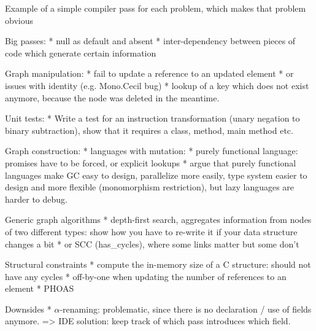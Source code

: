 Example of a simple compiler pass for each problem, which makes that problem obvious

Big passes:
* null as default and absent
* inter-dependency between pieces of code which generate certain information

Graph manipulation:
* fail to update a reference to an updated element
* or issues with identity (e.g. Mono.Cecil bug)
* lookup of a key which does not exist anymore, because the node was deleted in the meantime.

Unit tests:
* Write a test for an instruction transformation (unary negation to binary subtraction), show that it requires a class, method, main method etc.

Graph construction:
* languages with mutation: 
* purely functional language: promises have to be forced, or explicit lookups
* argue that purely functional languages make GC easy to design, parallelize more easily, type system easier to design and more flexible (monomorphism restriction), but lazy languages are harder to debug.

Generic graph algorithms
* depth-first search, aggregates information from nodes of two different types: show how you have to re-write it if your data structure changes a bit
* or SCC (has_cycles), where some links matter but some don't

Structural constraints
* compute the in-memory size of a C structure: should not have any cycles
* off-by-one when updating the number of references to an element
* PHOAS



Downsides
* $\alpha$-renaming: problematic, since there is no declaration / use of fields anymore.
=> IDE solution: keep track of which pass introduces which field.
